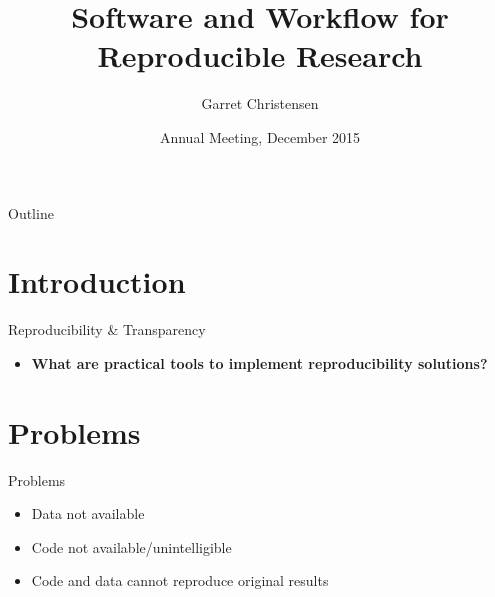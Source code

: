 \documentclass{beamer}
\title[Software and Workflow] %
{Software and Workflow for Reproducible Research}
\author[Christensen] %
{Garret Christensen\inst{1}}
\institute[UC Berkeley, Berkeley Initiatiative for Transparency in the Social Sciences] %
{
  \inst{1}%
  UC Berkeley: Berkeley Initiative for Transparency in the Social Sciences\\
  Berkeley Institute for Data Science
}
\date[Short Occasion] %
{Annual Meeting, December 2015}
\begin{document}


\begin{frame}
  \titlepage
\end{frame}

\begin{frame}{Outline}
  \tableofcontents
\end{frame}

\section{Introduction}

\begin{frame}{Reproducibility \& Transparency}
\begin{itemize}
\item \textbf{What are practical tools to implement reproducibility solutions?}
\end{itemize}
\end{frame}
\section{Problems}
\begin{frame}{Problems}
 \begin{itemize}
 \item Data not available
 \item Code not available/unintelligible
 \item Code and data cannot reproduce original results
 \end{itemize}
\end{frame}
\end{document}
